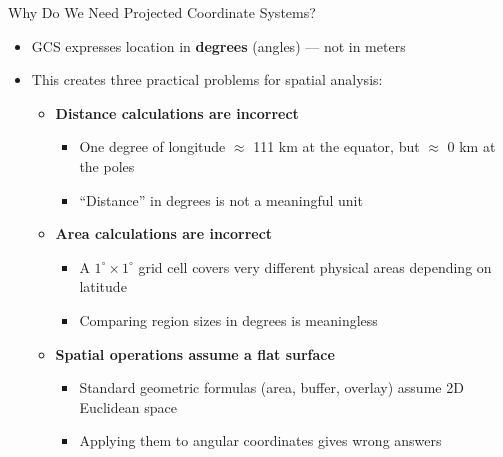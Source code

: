 \documentclass[dvipsnames,hyperref={pdfpagelabels=false}]{beamer}
\begin{document}
\begin{frame}{Why Do We Need Projected Coordinate Systems?}
    \begin{itemize}
        \item GCS expresses location in \textbf{degrees} (angles) --- not in meters
        \vspace{0.2cm}
        \item This creates three practical problems for spatial analysis:
        \vspace{0.3cm}
        \begin{itemize}
            \item \textbf{Distance calculations are incorrect}
            \vspace{0.1cm}
            \begin{itemize}
                \item One degree of longitude $\approx$ 111 km at the equator, but $\approx$ 0 km at the poles
                            \vspace{0.1cm}
                \item ``Distance'' in degrees is not a meaningful unit
            \end{itemize}
            \vspace{0.2cm}
            \item \textbf{Area calculations are incorrect}
            \vspace{0.1cm}
            \begin{itemize}
                \item A $1^\circ \times 1^\circ$ grid cell covers very different physical areas depending on latitude
                            \vspace{0.1cm}
                \item Comparing region sizes in degrees is meaningless
            \end{itemize}
            \vspace{0.2cm}
            \item \textbf{Spatial operations assume a flat surface}
            \vspace{0.1cm}
            \begin{itemize}
                \item Standard geometric formulas (area, buffer, overlay) assume 2D Euclidean space
                            \vspace{0.1cm}
                \item Applying them to angular coordinates gives wrong answers
            \end{itemize}
        \end{itemize}
    \end{itemize}


\end{frame} 
 
\end{document}
